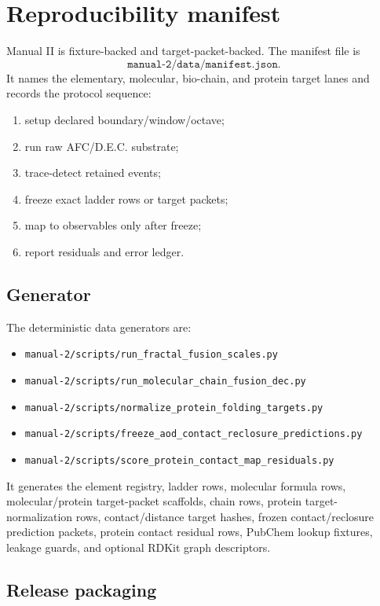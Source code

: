 \section{Reproducibility manifest}

Manual II is fixture-backed and target-packet-backed. The manifest file is
\[
\texttt{manual-2/data/manifest.json}.
\]
It names the elementary, molecular, bio-chain, and protein target lanes and records the protocol sequence:
\begin{enumerate}[leftmargin=2.3em]
  \item setup declared boundary/window/octave;
  \item run raw AFC/D.E.C. substrate;
  \item trace-detect retained events;
  \item freeze exact ladder rows or target packets;
  \item map to observables only after freeze;
  \item report residuals and error ledger.
\end{enumerate}

\subsection{Generator}

The deterministic data generators are:
\begin{itemize}[leftmargin=2.3em]
  \item \texttt{manual-2/scripts/run\_fractal\_fusion\_scales.py}
  \item \texttt{manual-2/scripts/run\_molecular\_chain\_fusion\_dec.py}
  \item \texttt{manual-2/scripts/normalize\_protein\_folding\_targets.py}
  \item \texttt{manual-2/scripts/freeze\_aod\_contact\_reclosure\_predictions.py}
  \item \texttt{manual-2/scripts/score\_protein\_contact\_map\_residuals.py}
\end{itemize}
It generates the element registry, ladder rows, molecular formula rows, molecular/protein target-packet scaffolds, chain rows, protein target-normalization rows, contact/distance target hashes, frozen contact/reclosure prediction packets, protein contact residual rows, PubChem lookup fixtures, leakage guards, and optional RDKit graph descriptors.

\subsection{Release packaging}

